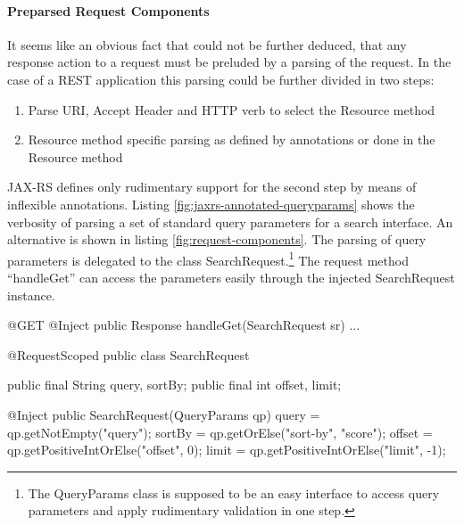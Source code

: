 \documentclass[12pt,a4paper]{scrartcl}		%
\begin{document}


\paragraph{Preparsed Request Components}
\label{sec:prep-requ-comp}

It seems like an obvious fact that could not be further deduced, that any
response action to a request must be preluded by a parsing of the request. In
the case of a REST application this parsing could be further divided in two
steps:
\begin{enumerate}
\item Parse URI, Accept Header and HTTP verb to select the Resource method
\item Resource method specific parsing as defined by annotations or done in the
  Resource method
\end{enumerate}

JAX-RS defines only rudimentary support for the second step by means of
inflexible annotations. Listing \ref{fig:jaxrs-annotated-queryparams} shows the
verbosity of parsing a set of standard query parameters for a search
interface. An alternative is shown in listing \ref{fig:request-components}. The
parsing of query parameters is delegated to the class
SearchRequest.\footnote{The QueryParams class is supposed to be an easy
  interface to access query parameters and apply rudimentary validation in one
  step.} The request method ``handleGet'' can access the parameters easily
through the injected SearchRequest instance.

\begin{javalisting}[label=fig:jaxrs-annotated-queryparams,
                   caption={Verbosity of parsing Requests with JAX-RS}]
@Get public Response get(@QueryParam("query") String query,
                         @QueryParam("sort-by") String sortBy,
                         @QueryParam("offset") int offset,
                         @QueryParam("limit") int limit ) {
\end{javalisting}

\begin{javalisting}[label=fig:request-components,
                   caption={Separating Request parsing from the Resource method}]
@GET @Inject
public Response handleGet(SearchRequest sr) { ... }

@RequestScoped
public class SearchRequest {
    public final String query, sortBy;
    public final int offset, limit;
    
    @Inject public SearchRequest(QueryParams qp) {
        query = qp.getNotEmpty("query");
        sortBy = qp.getOrElse("sort-by", "score");
        offset = qp.getPositiveIntOrElse("offset", 0);
        limit = qp.getPositiveIntOrElse("limit", -1);
    }
}
\end{javalisting}
\end{document}
